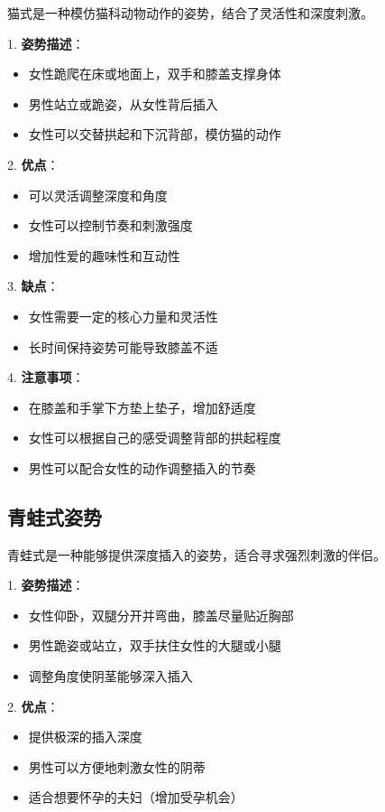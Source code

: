 \documentclass[12pt,UTF8]{ctexbook}
\begin{document}
猫式是一种模仿猫科动物动作的姿势，结合了灵活性和深度刺激。

1. \textbf{姿势描述}：
  \begin{itemize}
  \item 女性跪爬在床或地面上，双手和膝盖支撑身体
  \item 男性站立或跪姿，从女性背后插入
  \item 女性可以交替拱起和下沉背部，模仿猫的动作
  \end{itemize}

2. \textbf{优点}：
  \begin{itemize}
  \item 可以灵活调整深度和角度
  \item 女性可以控制节奏和刺激强度
  \item 增加性爱的趣味性和互动性
  \end{itemize}

3. \textbf{缺点}：
  \begin{itemize}
  \item 女性需要一定的核心力量和灵活性
  \item 长时间保持姿势可能导致膝盖不适
  \end{itemize}

4. \textbf{注意事项}：
  \begin{itemize}
  \item 在膝盖和手掌下方垫上垫子，增加舒适度
  \item 女性可以根据自己的感受调整背部的拱起程度
  \item 男性可以配合女性的动作调整插入的节奏
  \end{itemize}

\subsection{青蛙式姿势}

青蛙式是一种能够提供深度插入的姿势，适合寻求强烈刺激的伴侣。

1. \textbf{姿势描述}：
  \begin{itemize}
  \item 女性仰卧，双腿分开并弯曲，膝盖尽量贴近胸部
  \item 男性跪姿或站立，双手扶住女性的大腿或小腿
  \item 调整角度使阴茎能够深入插入
  \end{itemize}

2. \textbf{优点}：
  \begin{itemize}
  \item 提供极深的插入深度
  \item 男性可以方便地刺激女性的阴蒂
  \item 适合想要怀孕的夫妇（增加受孕机会）
  \end{itemize}
\end{document}
